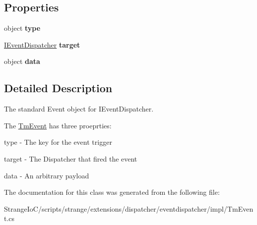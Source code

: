 \subsection*{Properties}
\begin{DoxyCompactItemize}
\item 
\hypertarget{classstrange_1_1extensions_1_1dispatcher_1_1eventdispatcher_1_1impl_1_1_tm_event_a76779732b987bf2d611735a6e6c328f6}{object {\bfseries type}}\label{classstrange_1_1extensions_1_1dispatcher_1_1eventdispatcher_1_1impl_1_1_tm_event_a76779732b987bf2d611735a6e6c328f6}

\item 
\hypertarget{classstrange_1_1extensions_1_1dispatcher_1_1eventdispatcher_1_1impl_1_1_tm_event_a4fad0978eb6dd43804c35390f96c23a6}{\hyperlink{interfacestrange_1_1extensions_1_1dispatcher_1_1eventdispatcher_1_1api_1_1_i_event_dispatcher}{I\-Event\-Dispatcher} {\bfseries target}}\label{classstrange_1_1extensions_1_1dispatcher_1_1eventdispatcher_1_1impl_1_1_tm_event_a4fad0978eb6dd43804c35390f96c23a6}

\item 
\hypertarget{classstrange_1_1extensions_1_1dispatcher_1_1eventdispatcher_1_1impl_1_1_tm_event_a2a7919deb2f3212dd0bcbf2ce86624fb}{object {\bfseries data}}\label{classstrange_1_1extensions_1_1dispatcher_1_1eventdispatcher_1_1impl_1_1_tm_event_a2a7919deb2f3212dd0bcbf2ce86624fb}

\end{DoxyCompactItemize}


\subsection{Detailed Description}
The standard Event object for I\-Event\-Dispatcher. 

The \hyperlink{classstrange_1_1extensions_1_1dispatcher_1_1eventdispatcher_1_1impl_1_1_tm_event}{Tm\-Event} has three proeprties\-: 
\begin{DoxyItemize}
\item type -\/ The key for the event trigger 
\item target -\/ The Dispatcher that fired the event 
\item data -\/ An arbitrary payload 
\end{DoxyItemize}

The documentation for this class was generated from the following file\-:\begin{DoxyCompactItemize}
\item 
Strange\-Io\-C/scripts/strange/extensions/dispatcher/eventdispatcher/impl/Tm\-Event.\-cs\end{DoxyCompactItemize}
